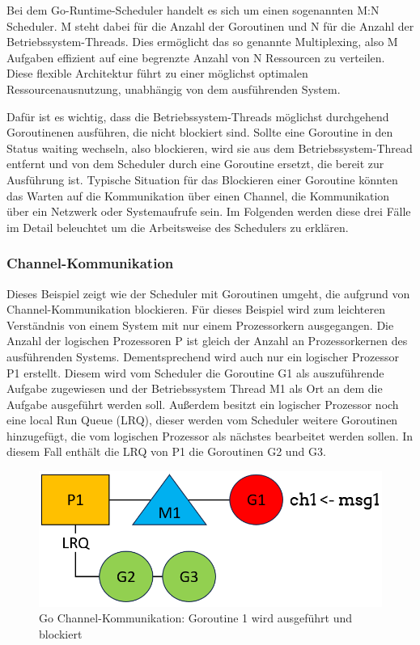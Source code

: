 \documentclass[fontsize=12pt,paper=a4,twoside=semi,parskip=half-,headsepline,headinclude]{scrreprt}
\begin{document}
Bei dem Go-Runtime-Scheduler handelt es sich um einen sogenannten M:N Scheduler. M steht dabei für die Anzahl der Goroutinen und N für die Anzahl der Betriebssystem-Threads. Dies ermöglicht das so genannte Multiplexing, also M Aufgaben effizient auf eine begrenzte Anzahl von N Ressourcen zu verteilen. Diese flexible Architektur führt zu einer möglichst optimalen Ressourcenausnutzung, unabhängig von dem ausführenden System.

Dafür ist es wichtig, dass die Betriebssystem-Threads möglichst durchgehend Goroutinenen ausführen, die nicht blockiert sind. Sollte eine Goroutine in den Status waiting wechseln, also blockieren, wird sie aus dem Betriebssystem-Thread entfernt und von dem Scheduler durch eine Goroutine ersetzt, die bereit zur Ausführung ist. Typische Situation für das Blockieren einer Goroutine könnten das Warten auf die Kommunikation über einen Channel, die Kommunikation über ein Netzwerk oder Systemaufrufe sein. Im Folgenden werden diese drei Fälle im Detail beleuchtet um die Arbeitsweise des Schedulers zu erklären.

\subsubsection{Channel-Kommunikation}

Dieses Beispiel zeigt wie der Scheduler mit Goroutinen umgeht, die aufgrund von Channel-Kommunikation blockieren. Für dieses Beispiel wird zum leichteren Verständnis von einem System mit nur einem Prozessorkern ausgegangen. Die Anzahl der logischen Prozessoren P ist gleich der Anzahl an Prozessorkernen des ausführenden Systems.  Dementsprechend wird auch nur ein logischer Prozessor P1 erstellt. Diesem wird vom Scheduler die Goroutine G1 als auszuführende Aufgabe zugewiesen und der Betriebssystem Thread M1 als Ort an dem die Aufgabe ausgeführt werden soll. Außerdem besitzt ein logischer Prozessor noch eine local Run Queue (LRQ), dieser werden vom Scheduler weitere Goroutinen hinzugefügt, die vom logischen Prozessor als nächstes bearbeitet werden sollen. In diesem Fall enthält die LRQ von P1 die Goroutinen G2 und G3.

\begin{figure}[H]
	\centering
	\includegraphics[scale=0.5]{figures/GoroutineChannel1.png}
	\caption{Go Channel-Kommunikation: Goroutine 1 wird ausgeführt und blockiert}
	\label{fig:GoroutineChannel1}
\end{figure}
\end{document}
